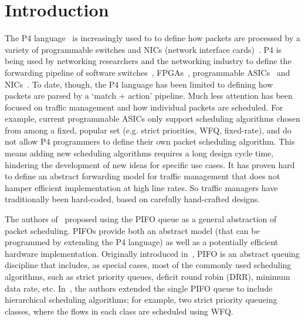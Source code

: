 \section{Introduction}

The P4 language~\cite{p4:2014} is increasingly used to to define how packets are processed by a variety of programmable switches and NICs (network interface cards)~\cite{p4org, p4runtime, Stratum}. P4 is being used by networking researchers and the networking industry to define the forwarding pipeline of software switches~\cite{Pisces}, FPGAs~\cite{SDNet}, programmable ASICs~\cite{Tofino, Xpliant} and NICs~\cite{Netronome}. To date, though, the P4 language has been limited to defining how packets are parsed by a `match + action' pipeline. Much less attention has been focused on traffic management and how individual packets are scheduled. For example, current programmable ASICs only support scheduling algorithms chosen from among a fixed, popular set (e.g. strict priorities, WFQ, fixed-rate), and do not allow P4 programmers to define their own packet scheduling algorithm. %
This means adding new scheduling algorithms requires a long design cycle time, hindering the development of new ideas for specific use cases. It has proven hard to define an abstract forwarding model for traffic management that does not hamper efficient implementation at high line rates.  So traffic managers have traditionally been hard-coded, based on carefully hand-crafted designs.

The authors of~\cite{pifo2016} proposed using the PIFO queue as a general abstraction of packet scheduling. PIFOs provide both an abstract model (that can be programmed by extending the P4 language) as well as a potentially efficient hardware implementation. Originally introduced in~\cite{pifo1999}, PIFO is an abstract queuing discipline that includes, as special cases, most of the commonly used scheduling algorithms, such as strict priority queues, deficit round robin (DRR), minimum data rate, etc. In~\cite{pifo2016}, the authors extended the single PIFO queue to include hierarchical scheduling algorithms; for example, two strict priority queueing classes, where the flows in each class are scheduled using WFQ. 

